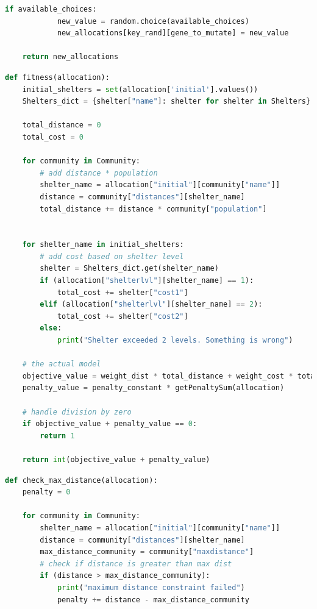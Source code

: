 \begin{appendices}
\begin{centerappendixtitle}
\begin{lstlisting}[language=Python,caption={Genetic Algorithm - Mutation}, label={mutationCode}]
        if available_choices:
            new_value = random.choice(available_choices)
            new_allocations[key_rand][gene_to_mutate] = new_value
            
    return new_allocations
\end{lstlisting}

\pagebreak
\begin{lstlisting}[language=Python,caption={Objective Value}, label={objValCode}]
def fitness(allocation):
    initial_shelters = set(allocation['initial'].values())
    Shelters_dict = {shelter["name"]: shelter for shelter in Shelters}

    total_distance = 0
    total_cost = 0

    for community in Community:
        # add distance * population
        shelter_name = allocation["initial"][community["name"]]
        distance = community["distances"][shelter_name]
        total_distance += distance * community["population"]


    for shelter_name in initial_shelters:
        # add cost based on shelter level
        shelter = Shelters_dict.get(shelter_name)
        if (allocation["shelterlvl"][shelter_name] == 1):
            total_cost += shelter["cost1"] 
        elif (allocation["shelterlvl"][shelter_name] == 2):
            total_cost += shelter["cost2"] 
        else:
            print("Shelter exceeded 2 levels. Something is wrong")
        
    # the actual model
    objective_value = weight_dist * total_distance + weight_cost * total_cost
    penalty_value = penalty_constant * getPenaltySum(allocation)

    # handle division by zero
    if objective_value + penalty_value == 0:
        return 1

    return int(objective_value + penalty_value)
\end{lstlisting}

\begin{lstlisting}[language=Python,caption={Maximum Distance Constraint}, label={maxdistCode}]
def check_max_distance(allocation):
    penalty = 0

    for community in Community:
        shelter_name = allocation["initial"][community["name"]]
        distance = community["distances"][shelter_name]
        max_distance_community = community["maxdistance"]
        # check if distance is greater than max dist
        if (distance > max_distance_community):
            print("maximum distance constraint failed")
            penalty += distance - max_distance_community
        

\end{lstlisting}
\end{centerappendixtitle}
\end{appendices}
